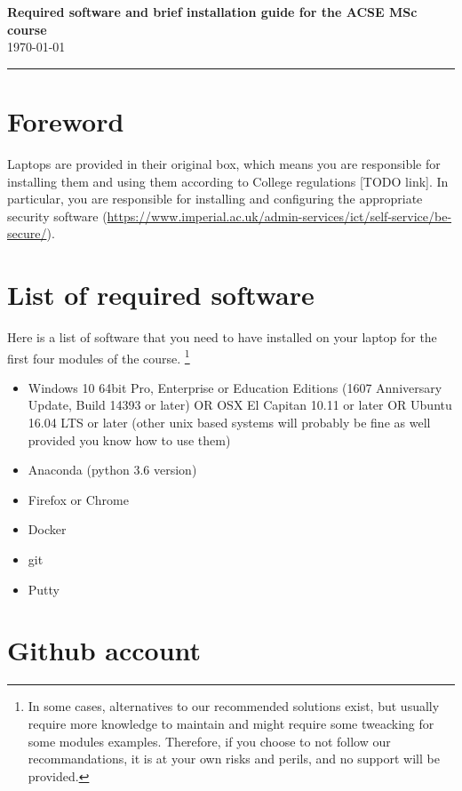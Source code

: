 \documentclass[11pt]{article}
\begin{document}
\begin{center}
{\bf \Large Required software and brief installation guide for the ACSE MSc course } \\ \today
\end{center}
\hrule
\vspace*{1cm}


\section{Foreword}

Laptops are provided in their original box, which means you are responsible for installing them and using them according to College regulations [TODO link]. 
In particular, you are responsible for installing and configuring the appropriate security software (\url{https://www.imperial.ac.uk/admin-services/ict/self-service/be-secure/}).


\section{List of required software}

Here is a list of  software that you need to have installed on your laptop for the first four modules of the course.
\footnote{In some cases, alternatives to our recommended solutions exist, but usually require more knowledge to maintain and might require some tweacking for some modules examples. 
Therefore, if you choose to not follow our recommandations, it is at your own risks and perils, and no support will be provided.}

\begin{itemize}
  \item Windows 10  64bit Pro, Enterprise or Education Editions (1607 Anniversary Update, Build 14393 or later) OR OSX  El Capitan 10.11 or later OR Ubuntu 16.04 LTS or later (other unix based systems will probably be fine as well provided you know how to use them)
  \item Anaconda (python 3.6 version)
  \item Firefox or Chrome
  \item Docker
  \item git
  \item Putty
\end{itemize}


\section{Github account}
\end{document}
